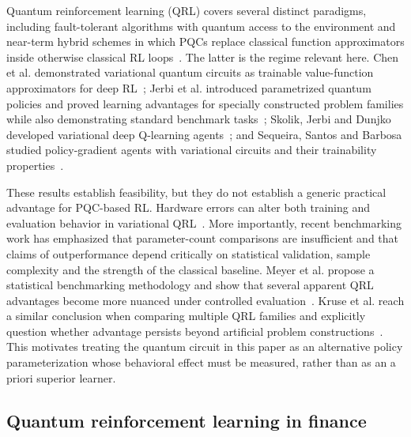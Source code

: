 \documentclass[aps,floatfix,superscriptaddress,twocolumn,tightenlines,amsmath,amssymb,nofootinbib,10pt,longbibliography,prl]{revtex4-2}
\begin{document}
Quantum reinforcement learning (QRL) covers several distinct paradigms, including fault-tolerant algorithms with quantum access to the environment and near-term hybrid schemes in which PQCs replace classical function approximators inside otherwise classical RL loops~\cite{Meyer2022SurveyQuantumRL,Kaldari2025QRLReview}. The latter is the regime relevant here. Chen et al. demonstrated variational quantum circuits as trainable value-function approximators for deep RL~\cite{Chen2020VariationalQuantumCi}; Jerbi et al. introduced parametrized quantum policies and proved learning advantages for specially constructed problem families while also demonstrating standard benchmark tasks~\cite{Jerbi2021ParametrizedQuantumP}; Skolik, Jerbi and Dunjko developed variational deep Q-learning agents~\cite{Skolik2022QuantumagentsintheGy}; and Sequeira, Santos and Barbosa studied policy-gradient agents with variational circuits and their trainability properties~\cite{Sequeira2023Policygradientsusing}.

These results establish feasibility, but they do not establish a generic practical advantage for PQC-based RL. Hardware errors can alter both training and evaluation behavior in variational QRL~\cite{Skolik2023Robustnessofquantumr}. More importantly, recent benchmarking work has emphasized that parameter-count comparisons are insufficient and that claims of outperformance depend critically on statistical validation, sample complexity and the strength of the classical baseline. Meyer et al. propose a statistical benchmarking methodology and show that several apparent QRL advantages become more nuanced under controlled evaluation~\cite{Meyer2025BenchmarkingQuantumR}. Kruse et al. reach a similar conclusion when comparing multiple QRL families and explicitly question whether advantage persists beyond artificial problem constructions~\cite{Kruse2025BenchmarkingQuantumRL}. This motivates treating the quantum circuit in this paper as an alternative policy parameterization whose behavioral effect must be measured, rather than as an a priori superior learner.

\subsection{Quantum reinforcement learning in finance}
\label{subsec:bg-qrl-finance}
\end{document}

